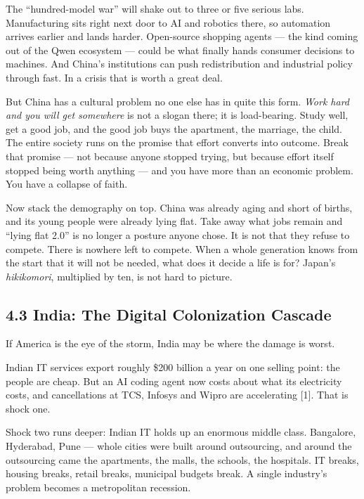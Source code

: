 \documentclass[11pt,a4paper]{article}
\begin{document}
The ``hundred-model war'' will shake out to three or five serious labs. Manufacturing sits right next door to AI and robotics there, so automation arrives earlier and lands harder. Open-source shopping agents --- the kind coming out of the Qwen ecosystem --- could be what finally hands consumer decisions to machines. And China's institutions can push redistribution and industrial policy through fast. In a crisis that is worth a great deal.

But China has a cultural problem no one else has in quite this form. \textit{Work hard and you will get somewhere} is not a slogan there; it is load-bearing. Study well, get a good job, and the good job buys the apartment, the marriage, the child. The entire society runs on the promise that effort converts into outcome. Break that promise --- not because anyone stopped trying, but because effort itself stopped being worth anything --- and you have more than an economic problem. You have a collapse of faith.

Now stack the demography on top. China was already aging and short of births, and its young people were already lying flat. Take away what jobs remain and ``lying flat 2.0'' is no longer a posture anyone chose. It is not that they refuse to compete. There is nowhere left to compete. When a whole generation knows from the start that it will not be needed, what does it decide a life is for? Japan's \textit{hikikomori}, multiplied by ten, is not hard to picture.

\subsection{4.3 India: The Digital Colonization Cascade}

If America is the eye of the storm, India may be where the damage is worst.

Indian IT services export roughly \$200 billion a year on one selling point: the people are cheap. But an AI coding agent now costs about what its electricity costs, and cancellations at TCS, Infosys and Wipro are accelerating [1]. That is shock one.

Shock two runs deeper: Indian IT holds up an enormous middle class. Bangalore, Hyderabad, Pune --- whole cities were built around outsourcing, and around the outsourcing came the apartments, the malls, the schools, the hospitals. IT breaks, housing breaks, retail breaks, municipal budgets break. A single industry's problem becomes a metropolitan recession.
\end{document}
